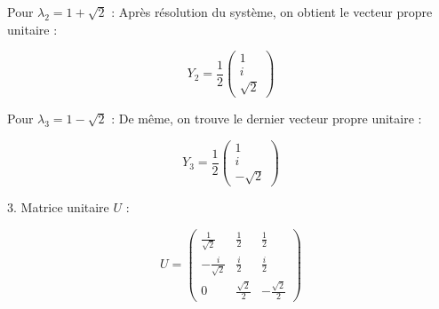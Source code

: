 \documentclass[french]{yLectureNote}
\begin{document}
Pour $\lambda_2 = 1+\sqrt{2}$ :
Après résolution du système, on obtient le vecteur propre unitaire :

$$Y_2 = \frac{1}{2} \begin{pmatrix} 1 \\ i \\ \sqrt{2} \end{pmatrix}$$


 Pour $\lambda_3 = 1-\sqrt{2}$ :
De même, on trouve le dernier vecteur propre unitaire :

$$Y_3 = \frac{1}{2} \begin{pmatrix} 1 \\ i \\ -\sqrt{2} \end{pmatrix}$$




3. Matrice unitaire $U$ :

$$U = \begin{pmatrix} \frac{1}{\sqrt{2}} & \frac{1}{2} & \frac{1}{2} \\ -\frac{i}{\sqrt{2}} & \frac{i}{2} & \frac{i}{2} \\ 0 & \frac{\sqrt{2}}{2} & -\frac{\sqrt{2}}{2} \end{pmatrix}$$
\end{document}
